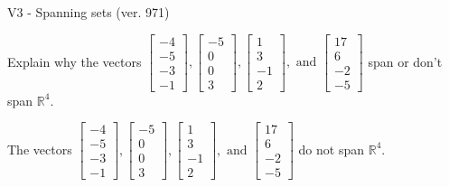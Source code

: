 \begin{exercise}
  \begin{exerciseTitle}V3 - Spanning sets (ver. 971)\end{exerciseTitle}
  \begin{exerciseStatement}
    Explain why the vectors \(\left[\begin{array}{r}
-4 \\
-5 \\
-3 \\
-1
\end{array}\right] , \left[\begin{array}{r}
-5 \\
0 \\
0 \\
3
\end{array}\right] , \left[\begin{array}{r}
1 \\
3 \\
-1 \\
2
\end{array}\right] , \text{ and } \left[\begin{array}{r}
17 \\
6 \\
-2 \\
-5
\end{array}\right]\) span or don't span \(\mathbb{R}^4\). 
	


  \end{exerciseStatement}
  \begin{exerciseAnswer}
   The vectors \(\left[\begin{array}{r}
-4 \\
-5 \\
-3 \\
-1
\end{array}\right] , \left[\begin{array}{r}
-5 \\
0 \\
0 \\
3
\end{array}\right] , \left[\begin{array}{r}
1 \\
3 \\
-1 \\
2
\end{array}\right] , \text{ and } \left[\begin{array}{r}
17 \\
6 \\
-2 \\
-5
\end{array}\right]\) 
  	 do not  
	span \(\mathbb{R}^4\).
  


  \end{exerciseAnswer}
\end{exercise}